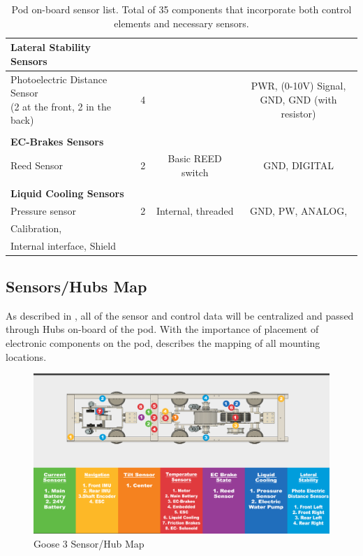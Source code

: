 \documentclass[main.tex]{subfiles}
\begin{document}
\begin{table}
\begin{tabularx}{\linewidth}{@{}lccc@{}}
	\textbf{Lateral Stability Sensors} & & & \\ \midrule
    \makecell{Photoelectric Distance Sensor \\ (2 at the front, 2 in the back)} & 4 &  & \makecell{PWR, (0-10V) Signal, \\ GND, GND (with resistor)} \\
    
    & & & \\
	\textbf{EC-Brakes Sensors} & & & \\ \midrule
    Reed Sensor & 2 & Basic REED switch & GND, DIGITAL \\
    
    & & & \\
    \textbf{Liquid Cooling Sensors} & & & \\ \midrule
    Pressure sensor & 2 & Internal, threaded & GND, PW, ANALOG, \\ Calibration, \\ Internal interface, Shield  \\\bottomrule
    \end{tabularx}
    \caption{Pod on-board sensor list. Total of 35 components that incorporate both control elements and necessary sensors.}
    \label{tab:pod-sensor-list}
\end{table}

\subsection{Sensors/Hubs Map}
As described in , all of the sensor and control data will be centralized and passed through Hubs on-board of the pod. With the importance of placement of electronic components on the pod,  describes the mapping of all mounting locations.

  \begin{figure}
        \centering
        \includegraphics[width=\textwidth]{images/SENSOR.png}
        \caption{Goose 3 Sensor/Hub Map}
        \label{fig:sensor-map}
    \end{figure}
\end{document}
